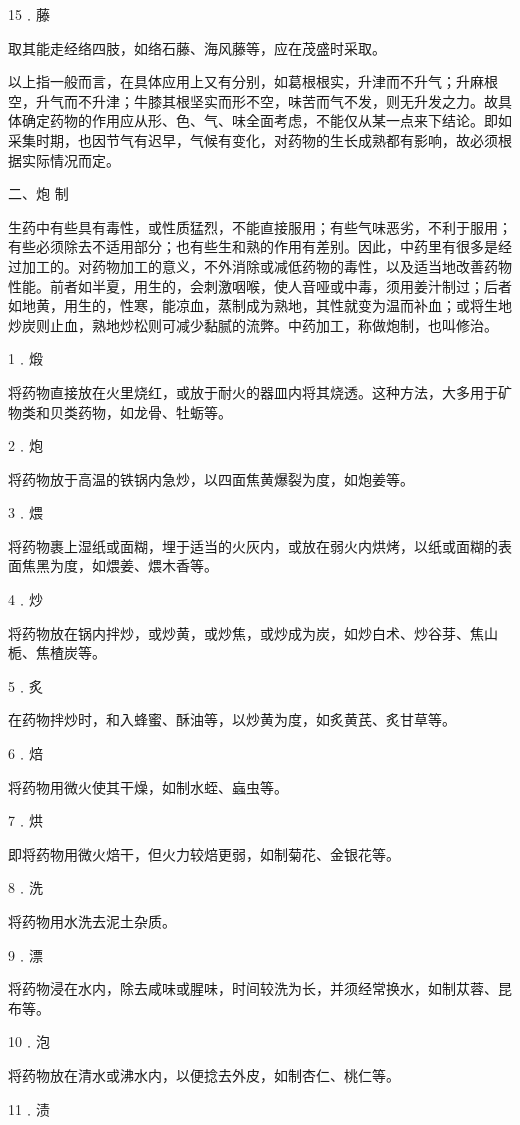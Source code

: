 \documentclass[a4paper,12pt,UTF8,twoside]{ctexbook}
\begin{document}
15﹒藤

取其能走经络四肢，如络石藤、海风藤等，应在茂盛时采取。

以上指一般而言，在具体应用上又有分别，如葛根根实，升津而不升气；升麻根空，升气而不升津；牛膝其根坚实而形不空，味苦而气不发，则无升发之力。故具体确定药物的作用应从形、色、气、味全面考虑，不能仅从某一点来下结论。即如采集时期，也因节气有迟早，气候有变化，对药物的生长成熟都有影响，故必须根据实际情况而定。

二、炮 制

生药中有些具有毒性，或性质猛烈，不能直接服用；有些气味恶劣，不利于服用；有些必须除去不适用部分；也有些生和熟的作用有差别。因此，中药里有很多是经过加工的。对药物加工的意义，不外消除或减低药物的毒性，以及适当地改善药物性能。前者如半夏，用生的，会刺激咽喉，使人音哑或中毒，须用姜汁制过；后者如地黄，用生的，性寒，能凉血，蒸制成为熟地，其性就变为温而补血；或将生地炒炭则止血，熟地炒松则可减少黏腻的流弊。中药加工，称做炮制，也叫修治。

1﹒煅

将药物直接放在火里烧红，或放于耐火的器皿内将其烧透。这种方法，大多用于矿物类和贝类药物，如龙骨、牡蛎等。

2﹒炮

将药物放于高温的铁锅内急炒，以四面焦黄爆裂为度，如炮姜等。

3﹒煨

将药物裹上湿纸或面糊，埋于适当的火灰内，或放在弱火内烘烤，以纸或面糊的表面焦黑为度，如煨姜、煨木香等。

4﹒炒

将药物放在锅内拌炒，或炒黄，或炒焦，或炒成为炭，如炒白术、炒谷芽、焦山栀、焦楂炭等。

5﹒炙

在药物拌炒时，和入蜂蜜、酥油等，以炒黄为度，如炙黄芪、炙甘草等。

6﹒焙

将药物用微火使其干燥，如制水蛭、蝱虫等。

7﹒烘

即将药物用微火焙干，但火力较焙更弱，如制菊花、金银花等。

8﹒洗

将药物用水洗去泥土杂质。

9﹒漂

将药物浸在水内，除去咸味或腥味，时间较洗为长，并须经常换水，如制苁蓉、昆布等。

10﹒泡

将药物放在清水或沸水内，以便捻去外皮，如制杏仁、桃仁等。

11﹒渍
\end{document}
